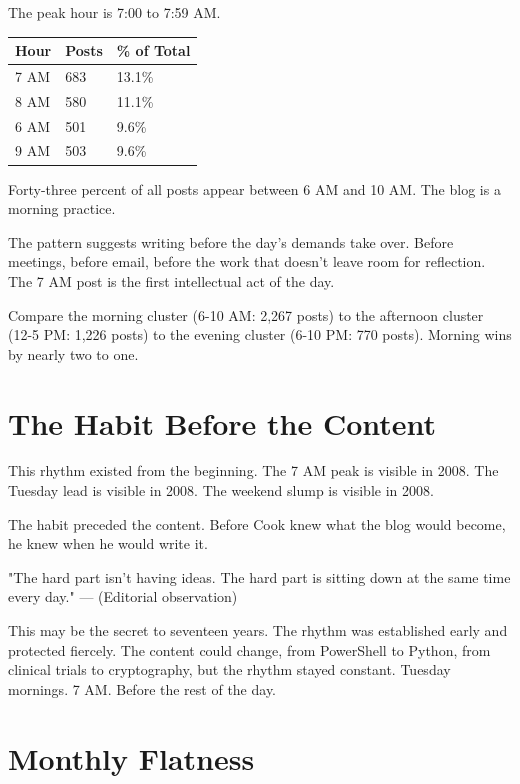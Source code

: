 The peak hour is 7:00 to 7:59 AM.

\begin{longtable}{p{3.00cm}p{3.00cm}p{3.00cm}}
\toprule
\textbf{Hour} & \textbf{Posts} & \textbf{\% of Total} \tabularnewline
\midrule
7 AM & 683 & 13.1\% \tabularnewline
8 AM & 580 & 11.1\% \tabularnewline
6 AM & 501 & 9.6\% \tabularnewline
9 AM & 503 & 9.6\% \tabularnewline
\bottomrule
\end{longtable}

Forty-three percent of all posts appear between 6 AM and 10 AM. The blog is a morning practice.

The pattern suggests writing before the day's demands take over. Before meetings, before email, before the work that doesn't leave room for reflection. The 7 AM post is the first intellectual act of the day.

Compare the morning cluster (6-10 AM: 2,267 posts) to the afternoon cluster (12-5 PM: 1,226 posts) to the evening cluster (6-10 PM: 770 posts). Morning wins by nearly two to one.

\bigskip

\section*{The Habit Before the Content}

This rhythm existed from the beginning. The 7 AM peak is visible in 2008. The Tuesday lead is visible in 2008. The weekend slump is visible in 2008.

The habit preceded the content. Before Cook knew what the blog would become, he knew when he would write it.

\begin{blogquote}
"The hard part isn't having ideas. The hard part is sitting down at the same time every day."
--- (Editorial observation)
\end{blogquote}

This may be the secret to seventeen years. The rhythm was established early and protected fiercely. The content could change, from PowerShell to Python, from clinical trials to cryptography, but the rhythm stayed constant. Tuesday mornings. 7 AM. Before the rest of the day.

\bigskip

\section*{Monthly Flatness}

